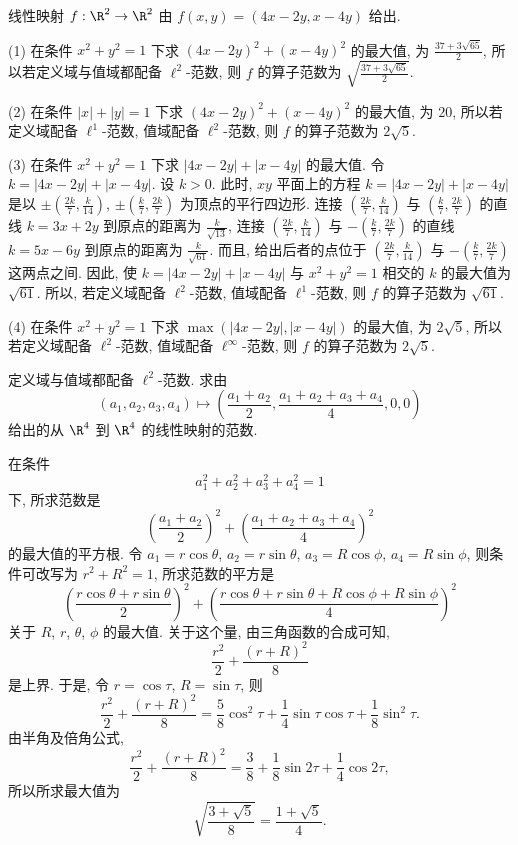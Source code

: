 \begin{example}\label{exa:1.4}
线性映射 $f: \R^{2} \to \R^{2}$ 由 $f(x, y) = (4x - 2y, x - 4y)$ 给出.

(1) 在条件 $x^{2} + y^{2} = 1$ 下求 $(4x-2y)^{2} + (x-4y)^{2}$ 的最大值, 为 $\frac{37 + 3\sqrt{65}}{2}$, 所以若定义域与值域都配备 $\ell^{2}$-范数, 则 $f$ 的算子范数为 $\sqrt{\frac{37 + 3\sqrt{65}}{2}}$.

(2) 在条件 $|x| + |y| = 1$ 下求 $(4x-2y)^{2} + (x-4y)^{2}$ 的最大值, 为 $20$, 所以若定义域配备 $\ell^{1}$-范数, 值域配备 $\ell^{2}$-范数, 则 $f$ 的算子范数为 $2\sqrt{5}$.

(3) 在条件 $x^{2} + y^{2} = 1$ 下求 $|4x - 2y| + |x - 4y|$ 的最大值. 令 $k = |4x - 2y| + |x - 4y|$. 设 $k > 0$. 此时, $xy$ 平面上的方程 $k = |4x - 2y| + |x - 4y|$ 是以 $\pm\left(\frac{2k}{7}, \frac{k}{14}\right)$, $\pm\left(\frac{k}{7}, \frac{2k}{7}\right)$ 为顶点的平行四边形. 连接 $\left(\frac{2k}{7}, \frac{k}{14}\right)$ 与 $\left(\frac{k}{7}, \frac{2k}{7}\right)$ 的直线 $k = 3x + 2y$ 到原点的距离为 $\frac{k}{\sqrt{13}}$, 连接 $\left(\frac{2k}{7}, \frac{k}{14}\right)$ 与 $-\left(\frac{k}{7}, \frac{2k}{7}\right)$ 的直线 $k = 5x - 6y$ 到原点的距离为 $\frac{k}{\sqrt{61}}$. 而且, 给出后者的点位于 $\left(\frac{2k}{7}, \frac{k}{14}\right)$ 与 $-\left(\frac{k}{7}, \frac{2k}{7}\right)$ 这两点之间. 因此, 使 $k = |4x - 2y| + |x - 4y|$ 与 $x^{2} + y^{2} = 1$ 相交的 $k$ 的最大值为 $\sqrt{61}$. 所以, 若定义域配备 $\ell^{2}$-范数, 值域配备 $\ell^{1}$-范数, 则 $f$ 的算子范数为 $\sqrt{61}$.

(4) 在条件 $x^{2} + y^{2} = 1$ 下求 $\max(|4x-2y|, |x-4y|)$ 的最大值, 为 $2\sqrt{5}$, 所以若定义域配备 $\ell^{2}$-范数, 值域配备 $\ell^{\infty}$-范数, 则 $f$ 的算子范数为 $2\sqrt{5}$.
\end{example}

\begin{example}\label{exa:1.5}
定义域与值域都配备 $\ell^{2}$-范数. 求由
\[
(a_{1}, a_{2}, a_{3}, a_{4}) \mapsto \left(\frac{a_{1} + a_{2}}{2}, \frac{a_{1} + a_{2} + a_{3} + a_{4}}{4}, 0, 0\right)
\]
给出的从 $\R^{4}$ 到 $\R^{4}$ 的线性映射的范数.

在条件
\[
a_{1}^{2} + a_{2}^{2} + a_{3}^{2} + a_{4}^{2} = 1
\]
下, 所求范数是
\[
\left(\frac{a_{1} + a_{2}}{2}\right)^{2} + \left(\frac{a_{1} + a_{2} + a_{3} + a_{4}}{4}\right)^{2}
\]
的最大值的平方根. 令 $a_{1} = r\cos\theta$, $a_{2} = r\sin\theta$, $a_{3} = R\cos\phi$, $a_{4} = R\sin\phi$, 则条件可改写为 $r^{2} + R^{2} = 1$, 所求范数的平方是
\[
\left(\frac{r\cos\theta + r\sin\theta}{2}\right)^{2} + \left(\frac{r\cos\theta + r\sin\theta + R\cos\phi + R\sin\phi}{4}\right)^{2}
\]
关于 $R$, $r$, $\theta$, $\phi$ 的最大值. 关于这个量, 由三角函数的合成可知,
\[
\frac{r^{2}}{2} + \frac{(r + R)^{2}}{8}
\]
是上界. 于是, 令 $r = \cos\tau$, $R = \sin\tau$, 则
\[
\frac{r^{2}}{2} + \frac{(r + R)^{2}}{8} = \frac{5}{8}\cos^{2}\tau + \frac{1}{4}\sin\tau\cos\tau + \frac{1}{8}\sin^{2}\tau.
\]
由半角及倍角公式,
\[
\frac{r^{2}}{2} + \frac{(r + R)^{2}}{8} = \frac{3}{8} + \frac{1}{8}\sin 2\tau + \frac{1}{4}\cos 2\tau,
\]
所以所求最大值为
\[
\sqrt{\frac{3 + \sqrt{5}}{8}} = \frac{1 + \sqrt{5}}{4}.
\]
\end{example}

